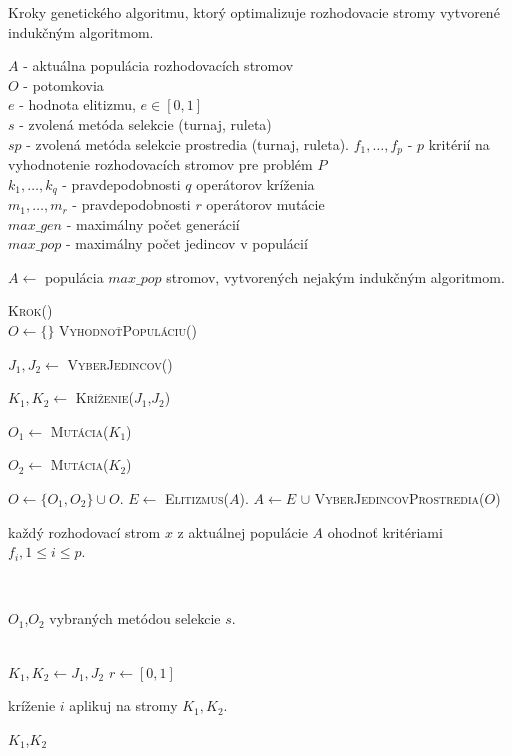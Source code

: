 \begin{algorithm}
\caption{Kroky genetického algoritmu, ktorý optimalizuje rozhodovacie stromy vytvorené indukčným algoritmom.}\label{fig:DTGeneticAlgo}
$A$ - aktuálna populácia rozhodovacích stromov \\
$O$ - potomkovia \\
$e$ - hodnota elitizmu, $e \in [0,1]$ \\
$s$ - zvolená metóda selekcie (turnaj, ruleta) \\
$sp$ - zvolená metóda selekcie prostredia (turnaj, ruleta).
$f_1,\ldots,f_p$ - $p$ kritérií na vyhodnotenie rozhodovacích stromov pre problém $P$\\
$k_{1},\ldots,k_{q}$ - pravdepodobnosti $q$ operátorov kríženia\\
$m_{1},\ldots,m_{r}$ - pravdepodobnosti $r$ operátorov mutácie\\
$max\_gen$ - maximálny počet generácií \\
$max\_pop$ - maximálny počet jedincov v populácií \\
\bigskip
\begin{algorithmic}[1]
\State \parbox[t]{375pt}{$A \gets $ populácia $max\_pop$ stromov, vytvorených nejakým indukčným algoritmom.}
	\State \textsc{Krok()}
\EndFor
\\
	\State $O \gets \{\}$
	\State \textsc{VyhodnoťPopuláciu()}
		\State \parbox[t]{350pt}{$J_1,J_2 \gets $ \textsc{VyberJedincov()}}
		\State \parbox[t]{350pt}{$K_1,K_2 \gets $ \textsc{Kríženie($J_1$,$J_2$)}}
		\State \parbox[t]{350pt}{$O_1 \gets $ \textsc{Mutácia($K_1$)}}
		\State \parbox[t]{350pt}{$O_2 \gets $ \textsc{Mutácia($K_2$)}}		
		\State $O \gets \{O_1,O_2\} \cup O$.
	\EndWhile
	\State $E \gets$ \textsc{Elitizmus($A$)}.
	\State $A \gets  E$ $\cup$ \textsc{VyberJedincovProstredia($O$)} 
\EndProcedure
\\
\State \parbox[t]{350pt}{každý rozhodovací strom $x$ z aktuálnej populácie $A$ ohodnoť kritériami $f_i, 1 \leq i \leq p$.}
\EndProcedure
\\
\State \Return \parbox[t]{300pt}{$O_1$,$O_2$ vybraných metódou selekcie $s$.}
\EndFunction
\\
\State $K_1, K_2 \gets J_1, J_2$
\State $r \gets [0,1]$
	\State \parbox[t]{300pt}{kríženie $i$ aplikuj na stromy $K_1, K_2$.}
\EndIf
\State \Return $K_1$,$K_2$
\EndFor 
\EndFunction
{}
\end{algorithmic}
\end{algorithm}

